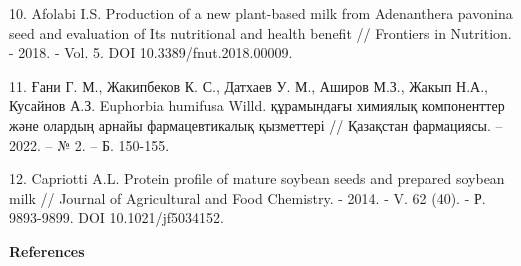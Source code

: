 \begin{noparindent}
10. Afolabi I.S. Production of a new plant-based milk from Adenanthera
pavonina seed and evaluation of Its nutritional and health benefit //
Frontiers in Nutrition. - 2018. - Vol. 5. DOI 10.3389/fnut.2018.00009.

11. Ғани Г. М., Жакипбеков К. С., Датхаев У. М., Аширов М.З., Жакып
Н.А., Кусайнов А.З. Euphorbia humifusa Willd. құрамындағы химиялық
компоненттер және олардың арнайы фармацевтикалық қызметтері // Қазақстан
фармациясы. -- 2022. -- № 2. -- Б. 150-155.

12. Capriotti A.L. Protein profile of mature soybean seeds and prepared
soybean milk // Journal of Agricultural and Food Chemistry. - 2014. - V.
62 (40). - Р. 9893-9899. DOI 10.1021/jf5034152.
\end{noparindent}

\begin{center}
{\bfseries References}
\end{center}

